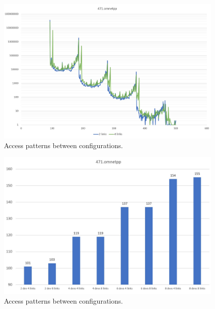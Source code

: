 \begin{figure}[!ht]
    \centering
    \includegraphics[width=1.0\linewidth]{figure/471-2_4-8.jpg}
    \caption{Access patterns between configurations.}
    \label{Memory-access-471-link-compare}
\end{figure}

\begin{figure}[!ht]
    \centering
    \includegraphics[width=1.0\linewidth]{figure/471-averages.jpg}
    \caption{Access patterns between configurations.}
    \label{Memory-access-471-averages}
\end{figure}

